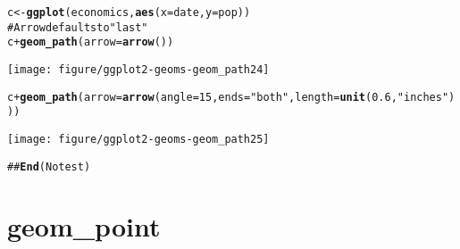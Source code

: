 \documentclass[a4paper,titlepage]{tufte-handout}\usepackage{graphicx, color}
\makeatletter
\def\maxwidth{ %
  \ifdim\Gin@nat@width>\linewidth
    \linewidth
  \else
    \Gin@nat@width
  \fi
}
\newcommand{\hlfunctioncall}[1]{\textcolor[rgb]{0.501960784313725,0,0.329411764705882}{\textbf{#1}}}%
\newcommand{\hlstring}[1]{\textcolor[rgb]{0.6,0.6,1}{#1}}%
\newcommand{\hlcomment}[1]{\textcolor[rgb]{0.180392156862745,0.6,0.341176470588235}{#1}}%
\newenvironment{kframe}{%
 \def\at@end@of@kframe{}%
 \ifinner\ifhmode%
  \def\at@end@of@kframe{\end{minipage}}%
  \begin{minipage}{\columnwidth}%
 \fi\fi%
 \def\FrameCommand##1{\hskip\@totalleftmargin \hskip-\fboxsep
 \colorbox{shadecolor}{##1}\hskip-\fboxsep
     \hskip-\linewidth \hskip-\@totalleftmargin \hskip\columnwidth}%
 \MakeFramed {\advance\hsize-\width
   \@totalleftmargin\z@ \linewidth\hsize
   \@setminipage}}%
 {\par\unskip\endMakeFramed%
 \at@end@of@kframe}
\newenvironment{knitrout}{}{} %
\makeatother
\begin{document}
\begin{knitrout}
\begin{kframe}
\begin{alltt}
c <- \hlfunctioncall{ggplot}(economics, \hlfunctioncall{aes}(x = date, y = pop))
# Arrow defaults to \hlstring{"last"}
c + \hlfunctioncall{geom_path}(arrow = \hlfunctioncall{arrow}())
\end{alltt}
\end{kframe}\texttt{[image: figure/ggplot2-geoms-geom\_path24]} \begin{kframe}\begin{alltt}
c + \hlfunctioncall{geom_path}(arrow = \hlfunctioncall{arrow}(angle = 15, ends = \hlstring{"both"}, length = \hlfunctioncall{unit}(0.6, \hlstring{"inches"})))
\end{alltt}
\end{kframe}\texttt{[image: figure/ggplot2-geoms-geom\_path25]} \begin{kframe}\begin{alltt}
\hlcomment{## \hlfunctioncall{End}(No test)}
\end{alltt}
\end{kframe}
\end{knitrout}


\section{geom\_point}
\end{document}
